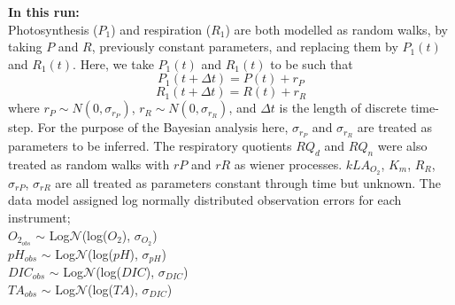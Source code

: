 \documentclass{ruthesis}
\begin{document}
\textbf{In this run:}\\
Photosynthesis ($P_1$) and respiration ($R_1$) are both modelled as random walks, by taking \begin{math}P\end{math} and \begin{math}R\end{math}, previously constant parameters, and replacing them by \begin{math}P_1(t)\end{math} and \begin{math}R_1(t)\end{math}. Here, we take \begin{math}P_1(t)\end{math} and \begin{math}R_1(t)\end{math} to be such that
\begin{displaymath}
P_1(t+\Delta t) = P(t) + r_P
\end{displaymath}
\begin{displaymath}
R_1(t+\Delta t) = R(t) + r_R
\end{displaymath}
where \begin{math}
r_P \sim N(0, \sigma_{r_P})
\end{math}, \begin{math}
r_R \sim N(0, \sigma_{r_R})
\end{math}, and \begin{math}
\Delta t
\end{math} is the length of discrete time-step. For the purpose of the Bayesian analysis here, \begin{math}\sigma_{r_P}\end{math} and \begin{math}\sigma_{r_R}\end{math} are treated as parameters to be inferred.  
The respiratory quotients $RQ_d$ and $RQ_n$ were also treated as random walks with $rP$ and $rR$ as wiener processes. 
$kLA_{O_2}$, $K_m$, $R_R$, $\sigma_{rP}$, $\sigma_{rR}$ are all treated as parameters constant through time but unknown. 
The data model assigned log normally distributed observation errors for each instrument;\\
$O_{2_{obs}}$ $\sim$ Log$\mathcal{N}$(log($O_2$), $\sigma_{O_2}$)\\
$pH_{obs}$ $\sim$ Log$\mathcal{N}$(log($pH$),  $\sigma_{pH}$)\\
$DIC_{obs}$ $\sim$ Log$\mathcal{N}$(log($DIC$), $\sigma_{DIC}$)\\
$TA_{obs}$ $\sim$ Log$\mathcal{N}$(log($TA$), $\sigma_{DIC}$)\\
\end{document}
